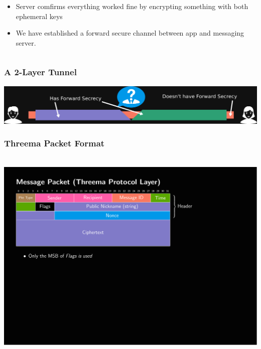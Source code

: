 \documentclass[
	aspectratio=169,
	xetex,
]{beamer}
\newcounter{i}
\begin{document}
\begin{frame}[t]
\begin{overlayarea}{\textwidth}{\textheight}
\begin{columns}
\begin{column}[t]{.69\textwidth}
\begin{overlayarea}{\textwidth}{\textheight}
{						\begin{itemize}
							\item Server comfirms everything worked fine by encrypting something with both \alert{ephemeral keys}
							\item We have established a forward secure channel between app and messaging server.
						\end{itemize}
					}	
				\end{overlayarea} \end{column}
		\end{columns}
	\end{overlayarea}
\end{frame}

\begin{frame}
	\frametitle{A 2-Layer Tunnel}
		\begin{center}\includegraphics[width=\textwidth]{img/2-layer-tunnel2.pdf}\end{center}
\end{frame}

\begin{frame}[t]
	\frametitle{Threema Packet Format}
	\-\\[1em]
	\includegraphics[page=1,clip,trim={.99cm 8cm 3.2cm 1.8cm},width=\textwidth]{out/messages.pdf}
\end{frame}
\end{document}
